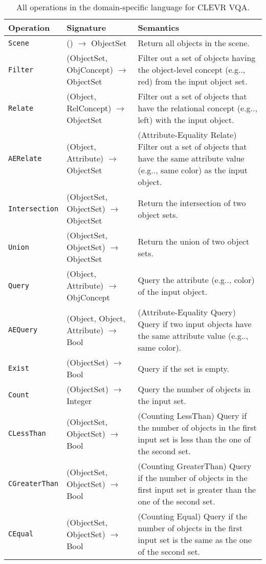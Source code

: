 \documentclass{article} \usepackage{iclr2019_conference,times}
\makeatletter
\DeclareRobustCommand\onedot{\futurelet\@let@token\@onedot}
\def\@onedot{\ifx\@let@token.\else.\null\fi\xspace}
\def\eg{e.g\onedot} \def\Eg{E.g\onedot}
\makeatother
\begin{document}
\begin{table}[ht]
    \centering
    \begin{tabular}{llp{}} \toprule
        Operation & Signature & Semantics\\ \midrule
        {\tt Scene} & () $\longrightarrow$ ObjectSet & Return all objects in the scene.\\ \midrule
        {\tt Filter} & (ObjectSet, ObjConcept) $\longrightarrow$ ObjectSet & Filter out a set of objects having the object-level concept (\eg, red) from the input object set. \\ \midrule
        {\tt Relate} & (Object, RelConcept) $\longrightarrow$ ObjectSet & Filter out a set of objects that have the relational concept (\eg, left) with the input object. \\ \midrule
        {\tt AERelate} & (Object, Attribute) $\longrightarrow$ ObjectSet & (Attribute-Equality Relate) Filter out a set of objects that have the same attribute value (\eg, same color) as the input object. \\ \midrule
        {\tt Intersection} & (ObjectSet, ObjectSet) $\longrightarrow$ ObjectSet & Return the intersection of two object sets. \\ \midrule
        {\tt Union} & (ObjectSet, ObjectSet) $\longrightarrow$ ObjectSet & Return the union of two object sets.\\ \midrule
        {\tt Query} & (Object, Attribute) $\longrightarrow$ ObjConcept & Query the attribute (\eg, color) of the input object.\\ \midrule
        {\tt AEQuery} & (Object, Object, Attribute) $\longrightarrow$ Bool & (Attribute-Equality Query) Query if two input objects have the same attribute value (\eg, same color).\\ \midrule
        {\tt Exist} & (ObjectSet) $\longrightarrow$ Bool & Query if the set is empty.\\ \midrule
        {\tt Count} & (ObjectSet) $\longrightarrow$ Integer & Query the number of objects in the input set.\\ \midrule
        {\tt CLessThan} & (ObjectSet, ObjectSet) $\longrightarrow$ Bool & (Counting LessThan) Query if the number of objects in the first input set is less than the one of the second set.\\ \midrule
        {\tt CGreaterThan} & (ObjectSet, ObjectSet) $\longrightarrow$ Bool & (Counting GreaterThan) Query if the number of objects in the first input set is greater than the one of the second set.\\ \midrule
        {\tt CEqual} & (ObjectSet, ObjectSet) $\longrightarrow$ Bool & (Counting Equal) Query if the number of objects in the first input set is the same as the one of the second set.\\ \bottomrule
    \end{tabular}
    \caption{All operations in the domain-specific language for CLEVR VQA.}
    \label{tab:clevr-dsl}
\end{table}
\end{document}
